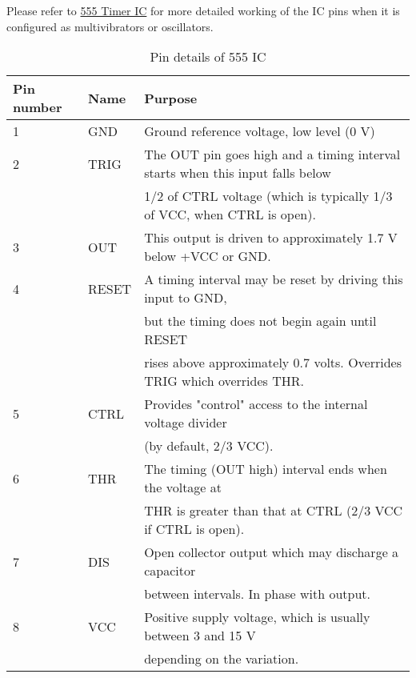 Please refer to \href{https://en.wikipedia.org/wiki/555_timer_IC}{555 Timer IC} for more detailed working of the IC pins when it is configured as multivibrators or oscillators.
\begin{table}
\caption{Pin details of 555 IC}

\label{555pindetails}

\begin{tabular}{|l|l|l|}


\hline
Pin number& Name& Purpose \\
\hline
1&	GND	& Ground reference voltage, low level (0 V)\\
\hline
2&	TRIG	& The OUT pin goes high and a timing interval starts when this input falls below\\& &  1/2 of  CTRL voltage (which is typically 1/3 of VCC, when CTRL is open).\\
\hline

3&OUT	&This output is driven to approximately 1.7 V below +VCC or GND.\\
\hline

4	& RESET &	A timing interval may be reset by driving this input to GND,\\& &  but the timing does not begin again until RESET\\& &  rises above approximately 0.7 volts. Overrides TRIG which overrides THR.\\
\hline

5&	CTRL&	Provides "control" access to the internal voltage divider \\& & (by default, 2/3 VCC).\\ \hline
6&	THR& 	The timing (OUT high) interval ends when the voltage at \\& & THR is greater than that at CTRL (2/3 VCC if CTRL is open).\\ \hline

7&	DIS&	Open collector output which may discharge a capacitor \\& & between intervals. In phase with output.\\ \hline
 
8&	VCC	& Positive supply voltage, which is usually between 3 and 15 V \\& &  depending on the variation.\\ \hline

 

\end{tabular}
\end{table}
%
%


